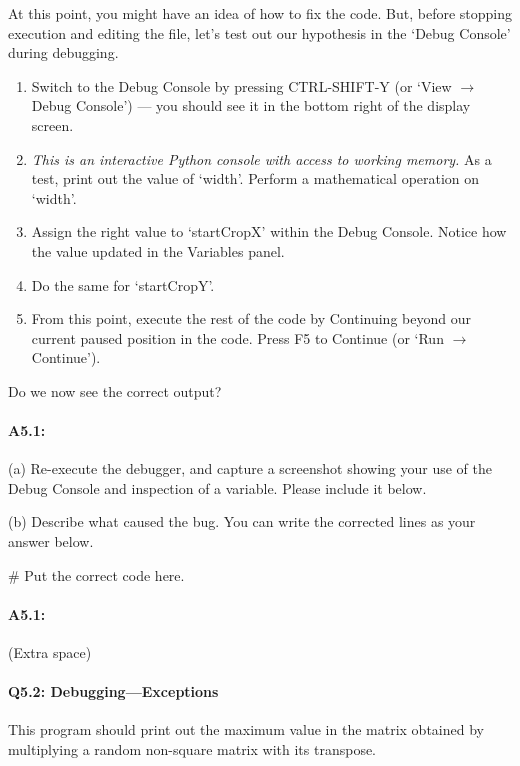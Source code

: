 \documentclass[11pt]{article}
\begin{document}
At this point, you might have an idea of how to fix the code. But, before stopping execution and editing the file, let's test out our hypothesis in the `Debug Console' during debugging.

\begin{enumerate}
    \item Switch to the Debug Console by pressing CTRL-SHIFT-Y (or `View $\rightarrow$ Debug Console') --- you should see it in the bottom right of the display screen.
    \item \emph{This is an interactive Python console with access to working memory.} As a test, print out the value of `width'. Perform a mathematical operation on `width'.
    \item Assign the right value to `startCropX' within the Debug Console. Notice how the value updated in the Variables panel.
    \item Do the same for `startCropY'.
    \item From this point, execute the rest of the code by Continuing beyond our current paused position in the code. Press F5 to Continue (or `Run $\rightarrow$ Continue').
\end{enumerate}

Do we now see the correct output?

\paragraph{A5.1: } (a) Re-execute the debugger, and capture a screenshot showing your use of the Debug Console and inspection of a variable. Please include it below.


(b) Describe what caused the bug. You can write the corrected lines as your answer below.
\begin{python}
# Put the correct code here.
\end{python}


\pagebreak
\paragraph{A5.1:}
(Extra space)

\pagebreak
\paragraph{Q5.2: Debugging---Exceptions} This program should print out the maximum value in the matrix obtained by multiplying a random non-square matrix with its transpose.
\end{document}
